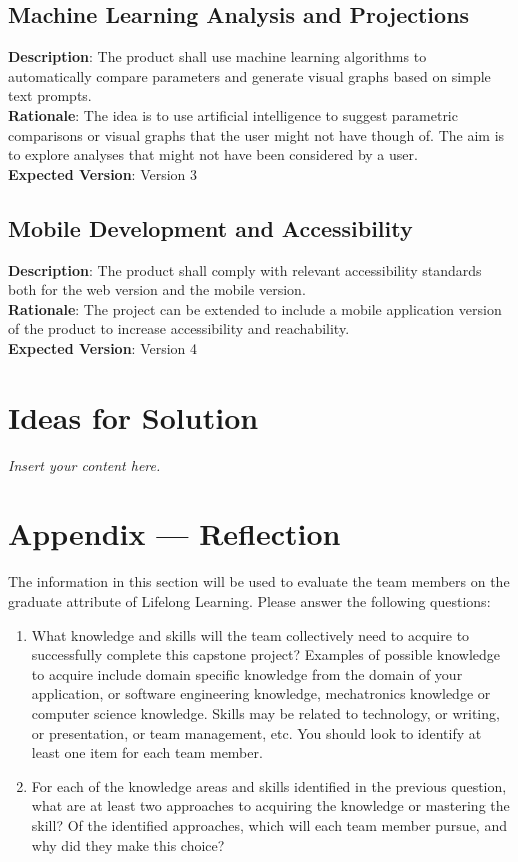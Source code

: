 \documentclass[12pt]{article}
\newcommand{\lips}{\textit{Insert your content here.}}
\begin{document}
\subsection{Machine Learning Analysis and Projections}
\textbf{Description}: The product shall use machine learning algorithms to automatically compare parameters and generate visual graphs based on simple text prompts.\\
\textbf{Rationale}: The idea is to use artificial intelligence to suggest parametric comparisons or visual graphs that the user might not have though of. The aim is to
explore analyses that might not have been considered by a user.\\
\textbf{Expected Version}: Version 3

\subsection{Mobile Development and Accessibility}
\textbf{Description}: The product shall comply with relevant accessibility standards both for the web version and the mobile version.\\
\textbf{Rationale}: The project can be extended to include a mobile application version of the product to increase accessibility and reachability.\\
\textbf{Expected Version}: Version 4

\section{Ideas for Solution}
\lips

\newpage{}
\section*{Appendix --- Reflection}

The information in this section will be used to evaluate the team members on the
graduate attribute of Lifelong Learning.  Please answer the following questions:

\begin{enumerate}
  \item What knowledge and skills will the team collectively need to acquire to
  successfully complete this capstone project?  Examples of possible knowledge
  to acquire include domain specific knowledge from the domain of your
  application, or software engineering knowledge, mechatronics knowledge or
  computer science knowledge.  Skills may be related to technology, or writing,
  or presentation, or team management, etc.  You should look to identify at
  least one item for each team member.
  \item For each of the knowledge areas and skills identified in the previous
  question, what are at least two approaches to acquiring the knowledge or
  mastering the skill?  Of the identified approaches, which will each team
  member pursue, and why did they make this choice?
\end{enumerate}
\end{document}
